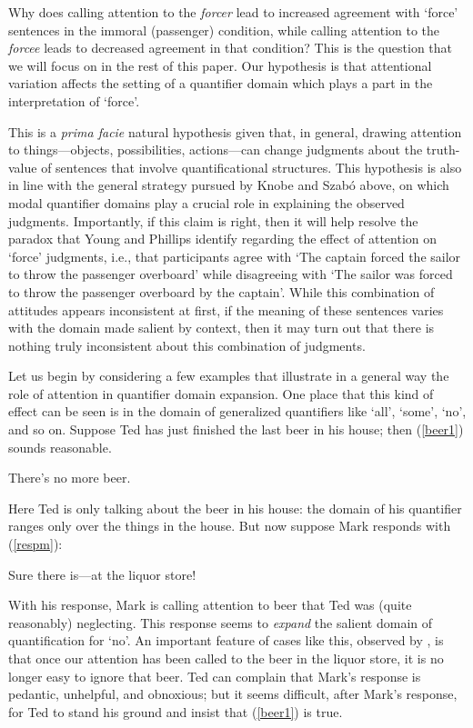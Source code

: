 \documentclass{salt}
\newcommand{\reff}[1]{(\ref{#1})}
\begin{document}
Why does calling attention to the \emph{forcer} lead to increased agreement with `force' sentences in the immoral (passenger) condition, while calling attention to the \emph{forcee} leads to decreased agreement in that condition? This is the question that we will focus on in the rest of this paper. Our hypothesis is that attentional variation affects the setting of a {quantifier domain} which plays a part in the interpretation of `force'. 

This is a \emph{prima facie} natural hypothesis given that, in general, drawing attention to things---objects, possibilities, actions---can change judgments about the truth-value of sentences that involve quantificational structures. This hypothesis is also in line with the general strategy pursued by Knobe and Szab\'o above, on which modal quantifier domains play a crucial role in explaining the observed judgments. Importantly, if this claim is right, then it will help resolve the paradox that Young and Phillips identify regarding the effect of attention on `force' judgments, i.e., that participants agree with `The captain forced the sailor to throw the passenger overboard' while disagreeing with `The sailor was forced to throw the passenger overboard by the captain'. While this combination of attitudes appears inconsistent at first, if the meaning of these sentences varies with the domain made salient by context, then it may turn out that there is nothing truly inconsistent about this combination of judgments.

Let us begin by considering a few examples that illustrate in a general way the role of attention in quantifier domain expansion. One place that this kind of effect can be seen is in the domain of generalized quantifiers like `all', `some', `no', and so on. Suppose Ted has just finished the last beer in his house; then \reff{beer1} sounds reasonable.

\begin{exe}\ex There's no more beer.\label{beer1} \end{exe}

\noindent Here Ted is only talking about the beer in his house: the domain of his quantifier ranges only over the things in the house. But now suppose Mark responds with \reff{respm}: 

\begin{exe}\ex Sure there is---at the liquor store!\label{respm}\end{exe}

\noindent With his response, Mark is calling attention to beer that Ted was (quite reasonably) neglecting. This response seems to \emph{expand} the salient domain of quantification for `no'. An important feature of cases like this, observed by \citet{LewisScorekeeping}, is that once our attention has been called to the beer in the liquor store, it is no longer easy to ignore that beer. Ted can complain that Mark's response is pedantic, unhelpful, and obnoxious; but it seems difficult, after Mark's response, for Ted to stand his ground and insist that \reff{beer1} is true.
 
\end{document}
